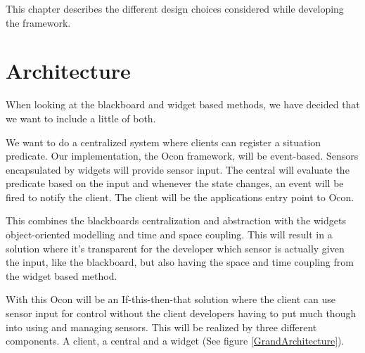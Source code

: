 \documentclass[../report.tex]{subfiles}
\begin{document}
\graphicspath{{img/}{../img/}}
This chapter describes the different design choices considered while developing the framework.

%
%

\section{Architecture}
When looking at the blackboard and widget based methods, we have decided that we want to include a little of both.

We want to do a centralized system where clients can register a situation predicate. Our implementation, the Ocon framework, will be event-based. Sensors encapsulated by widgets will provide sensor input. The central will evaluate the predicate based on the input and whenever the state changes, an event will be fired to notify the client. The client will be the applications entry point to Ocon.

This combines the blackboards centralization and abstraction with the widgets object-oriented modelling and time and space coupling. This will result in a solution where it's transparent for the developer which sensor is actually given the input, like the blackboard, but also having the space and time coupling from the widget based method.

With this Ocon will be an If-this-then-that solution where the client can use sensor input for control without the client developers having to put much though into using and managing sensors. This will be realized by three different components. A client, a central and a widget (See figure \ref{GrandArchitecture}).
\end{document}
